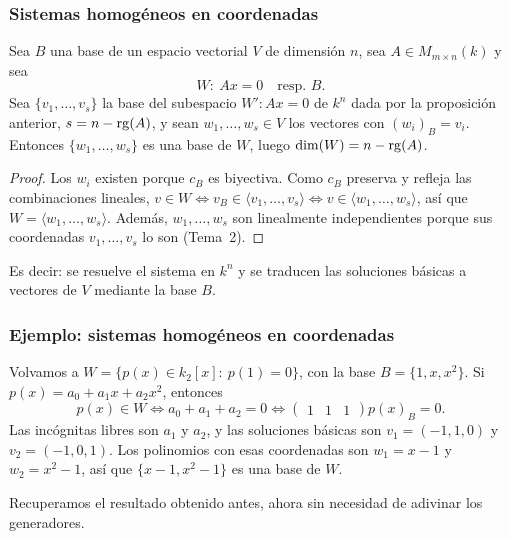 \begin{frame}
    \frametitle{Sistemas homogéneos en coordenadas}

    \begin{corollary}
        Sea $B$ una base de un espacio vectorial $V$ de dimensión $n$,
        sea $A\in M_{m\times n}(k)$ y sea
        \[
            W\colon\ Ax=0\quad\text{resp.\ }B.
        \]
        Sea $\{v_1,\ldots,v_s\}$ la base del subespacio $W'\colon Ax=0$ de $k^n$ dada por la
        proposición anterior, $s=n-\operatorname{rg}(A)$, y sean $w_1,\ldots,w_s\in V$ los vectores
        con $(w_i)_B=v_i$. Entonces $\{w_1,\ldots,w_s\}$ es una base
        de $W$, luego $\dim(W)=n-\operatorname{rg}(A)$.
    \end{corollary}

    \vspace{-8pt}

    \begin{proof}
        Los $w_i$ existen porque $c_B$ es biyectiva. Como $c_B$
        preserva y refleja las combinaciones lineales,
        $v\in W\Leftrightarrow v_B\in\langle v_1,\ldots,v_s\rangle
        \Leftrightarrow v\in\langle w_1,\ldots,w_s\rangle$,
        así que $W=\langle w_1,\ldots,w_s\rangle$. Además,
        $w_1,\ldots,w_s$ son linealmente independientes porque sus
        coordenadas $v_1,\ldots,v_s$ lo son (Tema~2).
    \end{proof}

    \vspace{-5pt}

    Es decir: se resuelve el sistema en $k^n$ y se \alert{traducen} las
    soluciones básicas a vectores de $V$ mediante la base $B$.
\end{frame}

\begin{frame}
    \frametitle{Ejemplo: sistemas homogéneos en coordenadas}

    \begin{example}
        Volvamos a $W=\{p(x)\in k_2[x]:\ p(1)=0\}$, con la base
        $B=\{1,x,x^2\}$. Si $p(x)=a_0+a_1x+a_2x^2$, entonces
        \[
            p(x)\in W\iff a_0+a_1+a_2=0
            \iff
            \begin{pmatrix}1&1&1\end{pmatrix}p(x)_B=0.
        \]
        Las incógnitas libres son $a_1$ y $a_2$, y las soluciones básicas
        son $v_1=(-1,1,0)$ y $v_2=(-1,0,1)$.
        Los polinomios con esas coordenadas son $w_1=x-1$ y $w_2=x^2-1$,
        así que $\{x-1,x^2-1\}$ es una base de $W$.
    \end{example}

    \medskip

    Recuperamos el resultado obtenido antes, ahora sin necesidad de
    \alert{adivinar} los generadores.
\end{frame}

